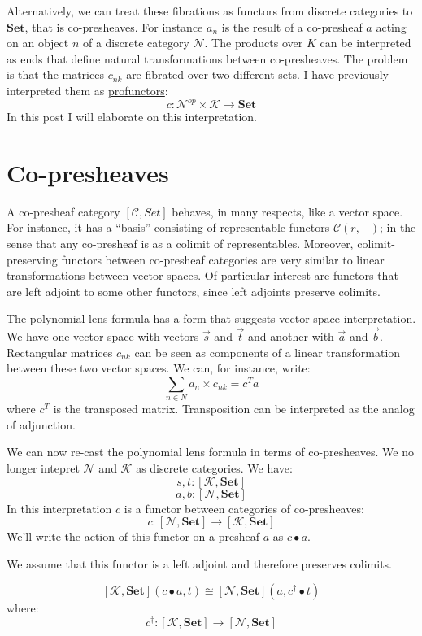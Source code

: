 \documentclass[11pt]{amsart}
\newcommand{\cat}[1]{\mathcal{#1}}%
\newcommand{\Cat}[1]{\mathbf{#1}}%
\newcommand{\Set}{\Cat{Set}}
\begin{document}
Alternatively, we can treat these fibrations as functors from discrete categories to $\Set$, that is co-presheaves. For instance $a_n$ is the result of a co-presheaf $a$ acting on an object $n$ of a discrete category $\cat N$. The products over $K$ can be interpreted as ends that define natural transformations between co-presheaves. The problem is that the matrices $c_{n k}$ are fibrated over two different sets. I have previously interpreted them as \href{https://bartoszmilewski.com/2021/12/10/profunctor-representation-of-a-polynomial-lens/}{profunctors}:
\[ c \colon \cat N^{op} \times \cat K \to \Set \]
In this post I will elaborate on this interpretation.

\section{Co-presheaves}

A co-presheaf category  $[\cat C, Set ]$ behaves, in many respects, like a vector space. For instance, it has a ``basis'' consisting of representable functors $\cat C (r, -)$; in the sense that any co-presheaf is as a colimit of representables. Moreover, colimit-preserving functors between co-presheaf categories are very similar to linear transformations between vector spaces. Of particular interest are functors that are left adjoint to some other functors, since left adjoints preserve colimits. 

The polynomial lens formula has a form that suggests vector-space interpretation. We have one vector space with vectors $\vec{s}$ and $\vec{t}$ and another with $\vec{a}$ and $\vec{b}$. Rectangular matrices $c_{n k}$ can be seen as components of a linear transformation between these two vector spaces. We can, for instance, write:
\[  \sum_{n \in N} a_n \times c_{n k} = c^T a \]
where $c^T$ is the transposed matrix. Transposition can be interpreted as the analog of adjunction. 

We can now re-cast the polynomial lens formula in terms of co-presheaves. We no longer intepret $\cat N$ and $\cat K$ as discrete categories. We have:
\[ s, t \colon [\cat K, \Set] \]
\[a, b \colon [\cat N, \Set] \]
In this interpretation $c$ is a functor between categories of co-presheaves:
\[ c \colon [\cat N, \Set] \to [\cat K, \Set] \]
We'll write the action of this functor on a presheaf $a$ as $c \bullet a$.

We assume that this functor is a left adjoint and therefore preserves colimits. 

\[ [\cat K, \Set] (c \bullet a, t) \cong [\cat N, \Set] (a, c^{\dagger} \bullet t) \]
where:
\[ c^{\dagger} \colon [\cat K, \Set] \to [\cat N, \Set] \]
\end{document}
